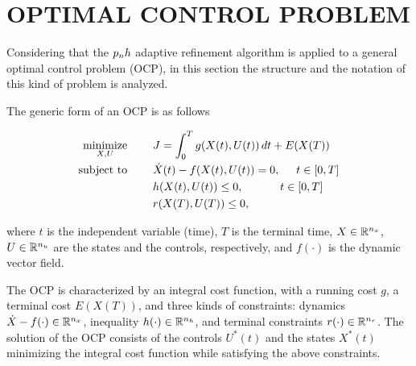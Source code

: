 \section*{OPTIMAL CONTROL PROBLEM}

Considering that the $p_{n}h$ adaptive refinement algorithm is applied to a general optimal control problem (OCP), in this section the structure and the notation of this kind of problem is analyzed.


The generic form of an OCP is as follows


\begin{subequations}\label{OCP}
	\begin{align}
	\underset{X,U}{\text{minimize}}\hspace{8mm} &J = \int_{0}^{T}g(X(t),U(t))\,dt + E(X(T)) \label{eq:cost}\\
	\text{subject to} \hspace{8mm} &\dot{X}(t) -  f(X(t),U(t)) = 0, \hspace{5mm} t \in[0,T] \label{eq:dyn}\\
	& h(X(t),U(t)) \leq 0,  \hspace{11.5mm} t \in[0,T] \label{eq:path}\\
	& r(X(T),U(T)) \leq 0, \label{eq:terminal}		
	\end{align}
\end{subequations}

where $t$ is the independent variable (time), $T$ is the terminal time, $X \in \mathbb{R}^{n_{x}}$, $U \in \mathbb{R}^{n_{u}}$ are the states and the controls, respectively, and $f (\cdot)$ is the dynamic vector field.

The OCP is characterized by an integral cost function, with a running cost $g$, a terminal cost $E(X(T))$, and three kinds of constraints: dynamics $\dot{X}-f(\cdot) \in \mathbb{R}^{n_{x}}$, inequality $h(\cdot) \in \mathbb{R}^{n_{h}}$, and terminal constraints $r(\cdot) \in \mathbb{R}^{n_{r}}$.
The solution of the OCP  consists of the controls $U^{*}(t)$ and the states $X^*(t)$  minimizing the integral cost function while satisfying the above constraints.


